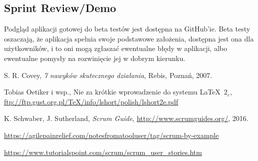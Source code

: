 \documentclass[a4paper]{article}
\begin{document}
	
	\subsection{Sprint Review/Demo}
	Podgląd aplikacji gotowej do beta testów jest dostępna na GitHub'ie. Beta testy oszaczają, że aplikacja spełnia swoje podstawowe założenia, dostępna jest ona dla użytkowników, i to oni mogą zgłaszać ewentualne błędy w aplikacji, albo ewentualne pomysły na rozwinięcie jej w dobrym kierunku.
	
	
	
	\begin{thebibliography}{9}
		
		 S. R. Covey, {\em 7 nawyków skutecznego działania}, Rebis, Poznań, 2007.
		
		 Tobias Oetiker i wsp., Nie za krótkie wprowadzenie do systemu \LaTeX  \ $2_\varepsilon$, \url{ftp://ftp.gust.org.pl/TeX/info/lshort/polish/lshort2e.pdf}
		
		 K. Schwaber, J. Sutherland, {\em Scrum Guide}, \url{http://www.scrumguides.org/}, 2016.
		
		 \url{https://agilepainrelief.com/notesfromatooluser/tag/scrum-by-example}
		
		 \url{https://www.tutorialspoint.com/scrum/scrum_user_stories.htm}
		
	\end{thebibliography}
	
\end{document}

